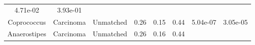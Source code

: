 \documentclass[12pt,]{article}
\begin{document}
\begin{longtable}[]{@{}cccccccc@{}}
\begin{minipage}[t]{0.06\columnwidth}
4.71e-02\strut
\end{minipage} & \begin{minipage}[t]{0.06\columnwidth}\centering\strut
3.93e-01\strut
\end{minipage}\tabularnewline
\begin{minipage}[t]{0.19\columnwidth}\centering\strut
Coprococcus\strut
\end{minipage} & \begin{minipage}[t]{0.07\columnwidth}\centering\strut
Carcinoma\strut
\end{minipage} & \begin{minipage}[t]{0.09\columnwidth}\centering\strut
Unmatched\strut
\end{minipage} & \begin{minipage}[t]{0.03\columnwidth}\centering\strut
0.26\strut
\end{minipage} & \begin{minipage}[t]{0.14\columnwidth}\centering\strut
0.15\strut
\end{minipage} & \begin{minipage}[t]{0.14\columnwidth}\centering\strut
0.44\strut
\end{minipage} & \begin{minipage}[t]{0.06\columnwidth}\centering\strut
5.04e-07\strut
\end{minipage} & \begin{minipage}[t]{0.06\columnwidth}\centering\strut
3.05e-05\strut
\end{minipage}\tabularnewline
\begin{minipage}[t]{0.19\columnwidth}\centering\strut
Anaerostipes\strut
\end{minipage} & \begin{minipage}[t]{0.07\columnwidth}\centering\strut
Carcinoma\strut
\end{minipage} & \begin{minipage}[t]{0.09\columnwidth}\centering\strut
Unmatched\strut
\end{minipage} & \begin{minipage}[t]{0.03\columnwidth}\centering\strut
0.26\strut
\end{minipage} & \begin{minipage}[t]{0.14\columnwidth}\centering\strut
0.16\strut
\end{minipage} & \begin{minipage}[t]{0.14\columnwidth}\centering\strut
0.44\strut
\end{minipage} & \begin{minipage}[t]{0.06\columnwidth}\centering\strut

\end{minipage}
\end{longtable}
\end{document}
